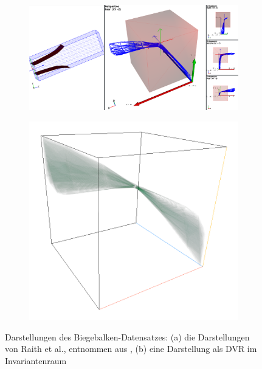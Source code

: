 \documentclass[a4paper,fontsize=12pt,toc=bib,parskip=half,ngerman]{scrartcl}
\begin{document}
\begin{figure}
	\begin{subfigure}{0.62\textwidth}
		\centering
		\includegraphics[width=\textwidth]{pictures/results/Beam/Beam_Raith.png}
		\subcaption{}
		\label{BeamRaith}
	\end{subfigure}
	\hspace*{\fill}
	\begin{subfigure}{0.32\textwidth}
		\centering
		\includegraphics[width=\textwidth]{pictures/results/Beam/Beam_InvariantSpace.png}
		\subcaption{}
		\label{BeamInvariant}
	\end{subfigure}
	\caption{Darstellungen des Biegebalken-Datensatzes: (a) die Darstellungen von Raith et al., entnommen aus \cite{raith2019tensor}, (b) eine Darstellung als DVR im Invariantenraum}
	\label{Beam}
\end{figure}
\end{document}
